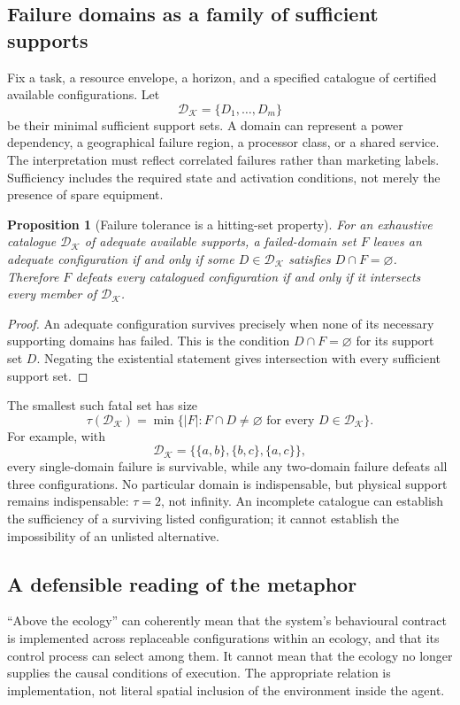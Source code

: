 \documentclass[11pt,a4paper]{article}
\newtheorem{proposition}[theorem]{Proposition}
\theoremstyle{definition}
\theoremstyle{remark}
\newcommand{\calK}{\mathcal{K}}
\begin{document}
\subsection{Failure domains as a family of sufficient supports}
Fix a task, a resource envelope, a horizon, and a specified catalogue of certified available configurations. Let
\[
 \mathscr D_{\calK}=\{D_1,\ldots,D_m\}
\]
be their minimal sufficient support sets. A domain can represent a power dependency, a geographical failure region, a processor class, or a shared service. The interpretation must reflect correlated failures rather than marketing labels. Sufficiency includes the required state and activation conditions, not merely the presence of spare equipment.

\begin{proposition}[Failure tolerance is a hitting-set property]\label{prop:hitting}
For an exhaustive catalogue $\mathscr D_{\calK}$ of adequate available supports, a failed-domain set $F$ leaves an adequate configuration if and only if some $D\in\mathscr D_{\calK}$ satisfies $D\cap F=\varnothing$. Therefore $F$ defeats every catalogued configuration if and only if it intersects every member of $\mathscr D_{\calK}$.
\end{proposition}
\begin{proof}
An adequate configuration survives precisely when none of its necessary supporting domains has failed. This is the condition $D\cap F=\varnothing$ for its support set $D$. Negating the existential statement gives intersection with every sufficient support set.
\end{proof}
The smallest such fatal set has size
\[
 \tau(\mathscr D_{\calK})
 =\min\{|F|:F\cap D\neq\varnothing\text{ for every }D\in\mathscr D_{\calK}\}.
\]
For example, with
\begin{equation}\label{eq:triangle}
 \mathscr D_{\calK}=\{\{a,b\},\{b,c\},\{a,c\}\},
\end{equation}
every single-domain failure is survivable, while any two-domain failure defeats all three configurations. No particular domain is indispensable, but physical support remains indispensable: $\tau=2$, not infinity. An incomplete catalogue can establish the sufficiency of a surviving listed configuration; it cannot establish the impossibility of an unlisted alternative.

\subsection{A defensible reading of the metaphor}
``Above the ecology'' can coherently mean that the system's behavioural contract is implemented across replaceable configurations within an ecology, and that its control process can select among them. It cannot mean that the ecology no longer supplies the causal conditions of execution. The appropriate relation is implementation, not literal spatial inclusion of the environment inside the agent.
\end{document}
